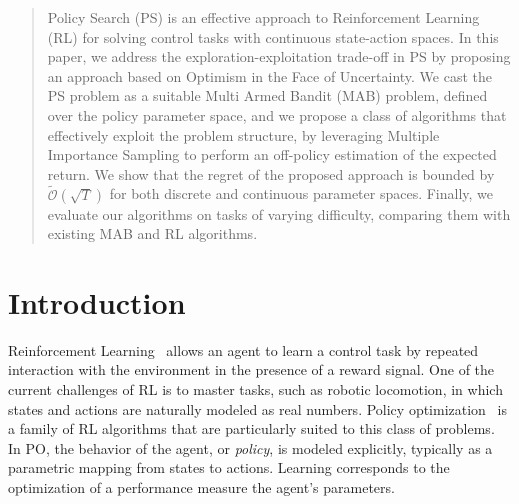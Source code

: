 \documentclass{article}
\begin{document}
\printAffiliationsAndNotice{}  %

\begin{abstract}
Policy Search (PS) is an effective approach to Reinforcement Learning (RL) for solving
control tasks with continuous state-action spaces. In this paper, we address the exploration-exploitation trade-off in PS by proposing an approach based on Optimism in the Face of Uncertainty. We cast the PS problem as a suitable Multi Armed Bandit (MAB) problem, defined over the policy parameter space, and we propose a class of algorithms that effectively exploit the problem structure, by leveraging Multiple Importance Sampling to perform an off-policy estimation of the expected return.
We show that the regret of the proposed approach is bounded by $\widetilde{\mathcal{O}}(\sqrt{T})$ for both discrete and continuous parameter spaces. Finally, we evaluate our algorithms on tasks of varying difficulty, comparing them with existing MAB and RL algorithms.
\end{abstract} 

\section{Introduction}
Reinforcement Learning~\citep[RL,][]{sutton2018reinforcement} allows an agent to learn a control task by repeated interaction with the environment in the presence of a reward signal. One of the current challenges of RL is to master tasks, such as robotic locomotion, in which states and actions are naturally modeled as real numbers. Policy optimization~\citep[PO,][]{deisenroth2013survey} is a family of RL algorithms that are particularly suited to this class of problems. In PO, the behavior of the agent, or \textit{policy}, is modeled explicitly, typically as a parametric mapping from states to actions. Learning corresponds to the optimization of a performance measure \wrt the agent's parameters. 
\end{document}
